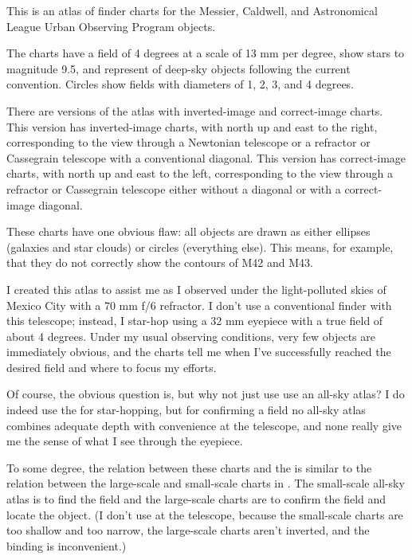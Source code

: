 This is an atlas of finder charts for the Messier, Caldwell, and Astronomical League Urban Observing Program objects. 

The charts have a field of 4 degrees at a scale of 13 mm per degree, show stars to magnitude 9.5, and represent of deep-sky objects following the current convention. Circles show fields with diameters of 1, 2, 3, and 4 degrees.

There are versions of the atlas with inverted-image and correct-image charts. 
\ifinverted
This version has inverted-image charts, with north up and east to the right, corresponding to the view through a Newtonian telescope or a refractor or Cassegrain telescope with a conventional diagonal.
\else
This version has correct-image charts, with north up and east to the left, corresponding to the view through a refractor or Cassegrain telescope either without a diagonal or with a correct-image diagonal.
\fi

These charts have one obvious flaw: all objects are drawn as either ellipses (galaxies and star clouds) or circles (everything else). This means, for example, that they do not correctly show the contours of M42 and M43.

I created this atlas to assist me as I observed under the light-polluted skies of Mexico City with a 70 mm f/6 refractor. I don't use a conventional finder with this telescope; instead, I star-hop using a 32 mm eyepiece with a true field of about 4 degrees. Under my usual observing conditions, very few objects are immediately obvious, and the charts tell me when I've successfully reached the desired field and where to focus my efforts.

Of course, the obvious question is, but why not just use use an all-sky atlas? I do indeed use the {\PSA} for star-hopping, but for confirming a field no all-sky atlas combines adequate depth with convenience at the telescope, and none really give me the sense of what I see through the eyepiece.


To some degree, the relation between these charts and the {\PSA} is similar to the relation between the large-scale and small-scale charts in . The small-scale all-sky atlas is to find the field and the large-scale charts are to confirm the field and locate the object. (I don’t use  at the telescope, because the small-scale charts are too shallow and too narrow, the large-scale charts aren’t inverted, and the binding is inconvenient.) 

